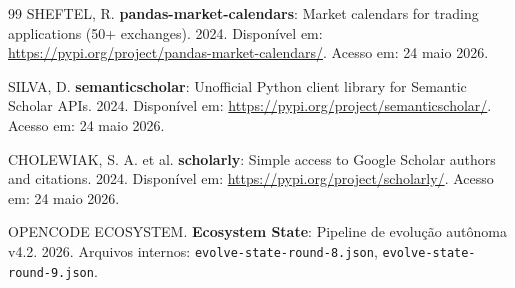 \documentclass[12pt,a4paper]{article}
\begin{document}
\begin{thebibliography}{99}
SHEFTEL, R. \textbf{pandas-market-calendars}: Market calendars for trading applications (50+ exchanges). 2024.
Disponível em: \url{https://pypi.org/project/pandas-market-calendars/}. Acesso em: 24 maio 2026.

SILVA, D. \textbf{semanticscholar}: Unofficial Python client library for Semantic Scholar APIs. 2024.
Disponível em: \url{https://pypi.org/project/semanticscholar/}. Acesso em: 24 maio 2026.

CHOLEWIAK, S. A. et al. \textbf{scholarly}: Simple access to Google Scholar authors and citations. 2024.
Disponível em: \url{https://pypi.org/project/scholarly/}. Acesso em: 24 maio 2026.

OPENCODE ECOSYSTEM. \textbf{Ecosystem State}: Pipeline de evolução autônoma v4.2. 2026.
Arquivos internos: \texttt{evolve-state-round-8.json}, \texttt{evolve-state-round-9.json}.

\end{thebibliography}
\end{document}
